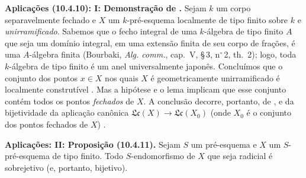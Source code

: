 \begin{env}[10.4.10]
\label{IV.10.4.10}
\textbf{Aplicações (10.4.10): I: Demonstração de .}
Sejam $k$ um corpo separavelmente fechado e $X$ um $k$-pré-esquema localmente de tipo finito sobre $k$ e \emph{unirramificado}.
Sabemos que o fecho integral de uma $k$-álgebra de tipo finito $A$ que seja um domínio integral, em uma extensão finita de seu corpo de frações, é uma $A$-álgebra finita (Bourbaki, \emph{Alg. comm.}, cap.~V, \S\,3, n$^\circ$\,2, th.~2); logo, toda $k$-álgebra de tipo finito é um anel universalmente japonês.
Concluímos que o conjunto dos pontos $x\in X$ nos quais $X$ é geometricamente unirramificado é localmente construtível .
Mas a hipótese e o lema  implicam que esse conjunto contém todos os pontos \emph{fechados} de $X$.
A conclusão decorre, portanto, de ,  e da bijetividade da aplicação canônica $\mathfrak{Lc}(X)\to\mathfrak{Lc}(X_0)$ (onde $X_0$ é o conjunto dos pontos fechados de $X$) .
\end{env}

\begin{env}[10.4.11]
\label{IV.10.4.11}
\textbf{Aplicações: II: Proposição (10.4.11).}
Sejam $S$ um pré-esquema e $X$ um $S$-pré-esquema de tipo finito.
Todo $S$-endomorfismo de $X$ que seja radicial é sobrejetivo (e, portanto, bijetivo).
\end{env}

